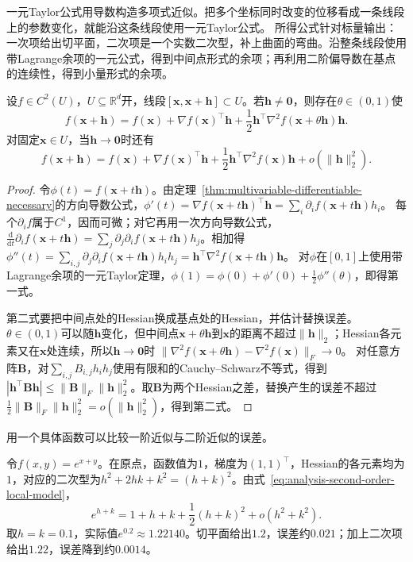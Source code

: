 一元Taylor公式用导数构造多项式近似。把多个坐标同时改变的位移看成一条线段上的参数变化，就能沿这条线段使用一元Taylor公式。
所得公式针对标量输出：一次项给出切平面，二次项是一个实数二次型，补上曲面的弯曲。沿整条线段使用带Lagrange余项的一元公式，得到中间点形式的余项；再利用二阶偏导数在基点的连续性，得到小量形式的余项。
\begin{theorem}[多元标量函数的二阶Taylor公式]
\label{thm:multivariable-second-order-taylor}
设$f\in C^2(U)$，$U\subseteq\mathbb R^d$开，线段$[\bm x,\bm x+\bm h]\subset U$。若$\bm h\neq\bm 0$，则存在$\theta\in(0,1)$使
\begin{equation}
 f(\bm x+\bm h)=f(\bm x)+\nabla f(\bm x)^\top\bm h
 +\frac12\bm h^\top\nabla^2f(\bm x+\theta\bm h)\bm h.
\label{eq:analysis-second-order-taylor}
\end{equation}
对固定$\bm x\in U$，当$\bm h\to\bm 0$时还有
\begin{equation}
 f(\bm x+\bm h)=f(\bm x)+\nabla f(\bm x)^\top\bm h
 +\frac12\bm h^\top\nabla^2f(\bm x)\bm h+o(\lVert\bm h\rVert_2^2).
\label{eq:analysis-second-order-local-model}
\end{equation}
\end{theorem}
\begin{proof}
令$\phi(t)=f(\bm x+t\bm h)$。由定理~\ref{thm:multivariable-differentiable-necessary}的方向导数公式，$\phi'(t)=\nabla f(\bm x+t\bm h)^\top\bm h=\sum_i\partial_if(\bm x+t\bm h)h_i$。
每个$\partial_if$属于$C^1$，因而可微；对它再用一次方向导数公式，$\frac{\mathrm d}{\mathrm dt}\partial_if(\bm x+t\bm h)=\sum_j\partial_j\partial_if(\bm x+t\bm h)h_j$。相加得$\phi''(t)=\sum_{i,j}\partial_j\partial_if(\bm x+t\bm h)h_ih_j=\bm h^\top\nabla^2f(\bm x+t\bm h)\bm h$。
对$\phi$在$[0,1]$上使用带Lagrange余项的一元Taylor定理，$\phi(1)=\phi(0)+\phi'(0)+\tfrac12\phi''(\theta)$，即得第一式。

第二式要把中间点处的Hessian换成基点处的Hessian，并估计替换误差。$\theta\in(0,1)$可以随$\bm h$变化，但中间点$\bm x+\theta\bm h$到$\bm x$的距离不超过$\lVert\bm h\rVert_2$；Hessian各元素又在$\bm x$处连续，所以$\bm h\to\bm 0$时
$\lVert\nabla^2f(\bm x+\theta\bm h)-\nabla^2f(\bm x)\rVert_F\to0$。
对任意方阵$\bm B$，对$\sum_{i,j}B_{i,j}h_i h_j$使用有限和的Cauchy--Schwarz不等式，得到$|\bm h^\top\bm B\bm h|\leq\lVert\bm B\rVert_F\lVert\bm h\rVert_2^2$。取$\bm B$为两个Hessian之差，替换产生的误差不超过$\tfrac12\lVert\bm B\rVert_F\lVert\bm h\rVert_2^2=o(\lVert\bm h\rVert_2^2)$，得到第二式。
\end{proof}
用一个具体函数可以比较一阶近似与二阶近似的误差。
\begin{example}[指数函数的二阶Taylor近似]
\label{ex:multivariable-exponential-taylor}
令$f(x,y)=e^{x+y}$。在原点，函数值为$1$，梯度为$(1,1)^\top$，Hessian的各元素均为$1$，对应的二次型为$h^2+2hk+k^2=(h+k)^2$。由式~\eqref{eq:analysis-second-order-local-model}，
\[
 e^{h+k}=1+h+k+\frac12(h+k)^2+o(h^2+k^2).
\]
取$h=k=0.1$，实际值$e^{0.2}\approx1.22140$。切平面给出$1.2$，误差约$0.021$；加上二次项给出$1.22$，误差降到约$0.0014$。
\end{example}

